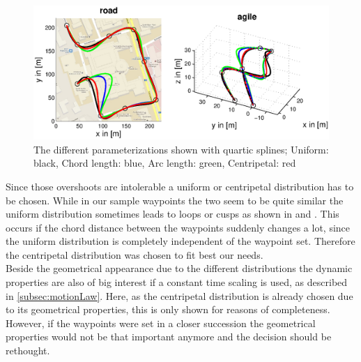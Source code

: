 \begin{figure}[H]
  \begin{minipage}[t]{0.9\textwidth}
    \includegraphics[width = \textwidth]{graphics/Parameterizations4_road_agile.eps}
  \end{minipage}
  \caption{The different parameterizations shown with quartic splines; Uniform: black, Chord length: blue, Arc length: green, Centripetal: red}
  \label{fig:parameterizations4_road_agile}
\end{figure}

Since those overshoots are intolerable a uniform or centripetal distribution has to be chosen. While in our sample waypoints the two seem to be quite similar the uniform distribution sometimes leads to  loops or cusps as shown in \cite{lee} and \cite{haron}. This occurs if the chord distance between the waypoints suddenly changes a lot, since the uniform distribution is completely independent of the waypoint set. Therefore the centripetal distribution was chosen to fit best our needs.
\\
Beside the geometrical appearance due to the different distributions the dynamic properties are also of big interest if a constant time scaling is used, as described in \ref{subsec:motionLaw}. Here, as the centripetal distribution is already chosen due to its geometrical properties, this is only shown for reasons of completeness. However, if the waypoints were set in a closer succession the geometrical properties would not be that important anymore and the decision should be rethought.


